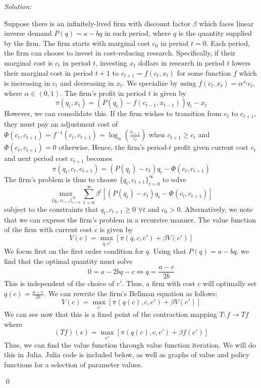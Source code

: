 \documentclass[12pt]{article}
\newenvironment{sol}
           {\emph{Solution:}
           }
           {
           \qed
           }
\begin{document}
       \begin{sol}
        Suppose there is an infinitely-lived firm with discount factor $\beta$ which faces linear inverse demand $P(q) = a - b q$ in each period, where $q$ is the quantity supplied by the firm. The firm starts with marginal cost $c_0$ in period $t=0$. Each period, the firm can choose to invest in cost-reducing research. Specifically, if their marginal cost is $c_t$ in period $t$, investing $x_t$ dollars in research in period $t$ lowers their marginal cost in period $t+1$ to $c_{t+1} = f(c_t, x_t)$ for some function $f$ which is increasing in $c_t$ and decreasing in $x_t$. We specialize by using $f(c_t, x_t) = \alpha^{x_t} c_t $, where $\alpha \in (0,1)$. The firm's profit in period $t$ is given by
        \[\pi(q_t, x_t) = (P(q_t) - f(c_{t-1}, x_{t-1}))q_t - x_t\]
        However, we can consolidate this. If the firm wishes to transition from $c_t$ to $c_{t+1}$, they must pay an adjustment cost of $\Phi(c_{t}, c_{t+1}) = f^{-1}(c_{t}, c_{t+1})= \log_{\alpha}\left(\frac{c_{t+1}}{c_t} \right)$ when $c_{t+1} \geq c_t$ and $\Phi(c_t, c_{t+1}) = 0$ otherwise. Hence, the firm's period-$t$ profit given current cost $c_t$ and next period cost $c_{t+1}$ becomes
        \[\pi(q_t, c_t, c_{t+1}) = (P(q_t) - c_t)q_t - \Phi(c_t, c_{t+1})\]
        The firm's problem is thus to choose $\{q_t, c_{t+1}\}_{t=0}^{\infty}$ to solve
        \[\max_{\{q_t, c_{t+1}\}_{t=0}^{\infty}} \sum_{t=0}^{\infty} \beta^t \left[(P(q_t) - c_t)q_t - \Phi(c_t, c_{t+1})\right]\]
        subject to the constraints that $q_t, c_{t+1} \geq 0$ $\forall t$ and $c_{0} > 0$.
        Alternatively, we note that we can express the firm's problem in a recursive manner. The value function of the firm with current cost $c$ is given by 
        \[V(c) = \max_{q, c'} \left[\pi(q, c, c') + \beta V(c')\right]\]
        We focus first on the first order condition for $q$. Using that $P(q) = a - bq$, we find that the optimal quantity must solve 
        \[0 = a - 2bq - c  \iff q = \frac{a -c}{2b}\]
        This is independent of the choice of $c'$. Thus, a firm with cost $c$ will optimally set $q(c) = \frac{a-c}{2b}$. We can rewrite the firm's Bellman equation as follows:
        \[V(c) = \max_{c'} \left[\pi(q(c), c, c') + \beta V(c')\right]\]
        We can see now that this is a fixed point of the contraction mapping $T: f \rightarrow Tf$ where
        \[(T f)(c) = \max_{c'} \left[ \pi(q(c), c, c') + \beta f(c') \right]\]
        Thus, we can find the value function through value function iteration. We will do this in Julia. Julia code is included below, as well as graphs of value and policy functions for a selection of parameter values.

\end{sol}
\end{document}
